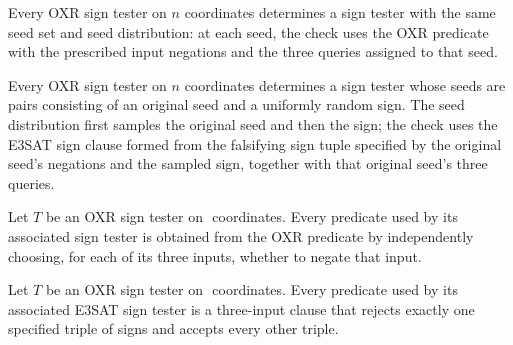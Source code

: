 \begin{definition}
\label{FABL.OXRSignTester.toSignTester}
\leanok
{}
Every OXR sign tester on $n$ coordinates determines a sign tester with the same seed set
and seed distribution: at each seed, the check uses the OXR predicate with the
prescribed input negations and the three queries assigned to that seed.
\end{definition}

\begin{definition}
\label{FABL.OXRSignTester.toE3SatTester}
\leanok
{}
Every OXR sign tester on $n$ coordinates determines a sign tester whose seeds are pairs
consisting of an original seed and a uniformly random sign. The seed distribution first
samples the original seed and then the sign; the check uses the E3SAT sign clause formed
from the falsifying sign tuple specified by the original seed's negations and the
sampled sign, together with that original seed's three queries.
\end{definition}

\begin{theorem}
\label{FABL.OXRSignTester.toSignTester_usesMaxOXR}
\leanok
{}
Let $T$ be an OXR sign tester on $
$ coordinates. Every predicate used by its associated sign tester is obtained from the
OXR predicate by independently choosing, for each of its three inputs, whether to negate
that input.
\end{theorem}

\begin{theorem}
\label{FABL.OXRSignTester.toE3SatTester_usesMaxE3Sat}
\leanok
{}
Let $T$ be an OXR sign tester on $
$ coordinates. Every predicate used by its associated E3SAT sign tester is a three-input
clause that rejects exactly one specified triple of signs and accepts every other
triple.
\end{theorem}

